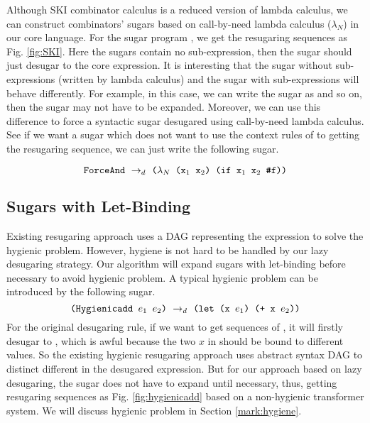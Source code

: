 Although SKI combinator calculus is a reduced version of lambda calculus, we can construct combinators' sugars based on call-by-need lambda calculus ($\lambda_N$) in our core language. For the sugar program , we get the resugaring sequences as Fig.  \ref{fig:SKI}. Here the sugars contain no sub-expression, then the sugar should just desugar to the core expression. It is interesting that the sugar without sub-expressions (written by lambda calculus) and the sugar with sub-expressions will behave differently. For example, in this case, we can write the sugar as  and so on, then the sugar may not have to be expanded. Moreover, we can use this difference to force a syntactic sugar desugared using call-by-need lambda calculus. See if we want a sugar  which does not
want to use the context rules of  to getting the resugaring sequence, we can just write the following sugar.

\[
\texttt{ForceAnd} ~\rightarrow_d~ \texttt{($\lambda_N$ ($\mbox{\tt x}_1$ $\mbox{\tt x}_2$) (if $\mbox{\tt x}_1$ $\mbox{\tt x}_2$ \#f))}
\]






\subsection{Sugars with Let-Binding}
\label{mark:hygienic}


Existing resugaring approach \cite{hygienic} uses a DAG representing the expression to solve the hygienic problem. However, hygiene is not hard to be handled by our lazy desugaring strategy. Our algorithm will expand sugars with let-binding before necessary to avoid hygienic problem.
A typical hygienic problem can be introduced by the following sugar.
\[
\texttt{(Hygienicadd $e_1$ $e_2$)} ~\rightarrow_d~ \texttt{(let (x $e_1$) (+ x $e_2$))}
\]
For the original desugaring rule, if we want to get sequences of , it will firstly desugar to , which is awful because the two $x$ in  should be bound to different values. So the existing hygienic resugaring approach uses abstract syntax DAG to distinct different  in the desugared expression. But for our approach based on lazy desugaring, the  sugar does not have to expand until necessary, thus, getting resugaring sequences as Fig.  \ref{fig:hygienicadd} based on a non-hygienic transformer system. We will discuss hygienic problem in Section \ref{mark:hygiene}.


